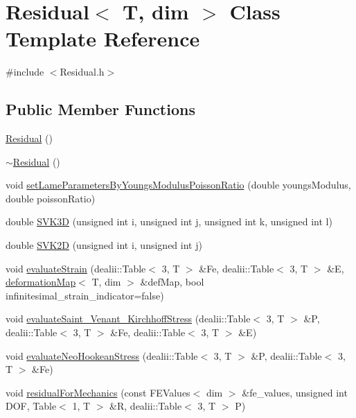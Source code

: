\section{Residual$<$ T, dim $>$ Class Template Reference}
\label{class_residual}


{\ttfamily \#include $<$Residual.\-h$>$}

\subsection*{Public Member Functions}
\begin{DoxyCompactItemize}
\item 
\hyperlink{class_residual_a4b540ba8e3ad0a1f8cfe2b4acd20493b}{Residual} ()
\item 
\hyperlink{class_residual_a8eef8c757003dd763b7dddc733f65641}{$\sim$\-Residual} ()
\item 
void \hyperlink{class_residual_a74a86942f009e483e946ac0a0036bd71}{set\-Lame\-Parameters\-By\-Youngs\-Modulus\-Poisson\-Ratio} (double youngs\-Modulus, double poisson\-Ratio)
\item 
double \hyperlink{class_residual_a10e7144d5c4746f15a48d506830790cb}{S\-V\-K3\-D} (unsigned int i, unsigned int j, unsigned int k, unsigned int l)
\item 
double \hyperlink{class_residual_abd1627afa72ac735e6907067e1d47bb6}{S\-V\-K2\-D} (unsigned int i, unsigned int j)
\item 
void \hyperlink{class_residual_a4b181b84ebad5e2adb629b4a542dc9c6}{evaluate\-Strain} (dealii\-::\-Table$<$ 3, T $>$ \&Fe, dealii\-::\-Table$<$ 3, T $>$ \&E, \hyperlink{structdeformation_map}{deformation\-Map}$<$ T, dim $>$ \&def\-Map, bool infinitesimal\-\_\-strain\-\_\-indicator=false)
\item 
void \hyperlink{class_residual_a4215ec5a6eabd7573e0caeee6fd194ad}{evaluate\-Saint\-\_\-\-Venant\-\_\-\-Kirchhoff\-Stress} (dealii\-::\-Table$<$ 3, T $>$ \&P, dealii\-::\-Table$<$ 3, T $>$ \&Fe, dealii\-::\-Table$<$ 3, T $>$ \&E)
\item 
void \hyperlink{class_residual_a0f9ff6a237d377803ce368b26ca39652}{evaluate\-Neo\-Hookean\-Stress} (dealii\-::\-Table$<$ 3, T $>$ \&P, dealii\-::\-Table$<$ 3, T $>$ \&Fe)
\item 
void \hyperlink{class_residual_a432fe02216f182fd241f09775131f854}{residual\-For\-Mechanics} (const F\-E\-Values$<$ dim $>$ \&fe\-\_\-values, unsigned int D\-O\-F, Table$<$ 1, T $>$ \&R, dealii\-::\-Table$<$ 3, T $>$ P)

\end{DoxyCompactItemize}
